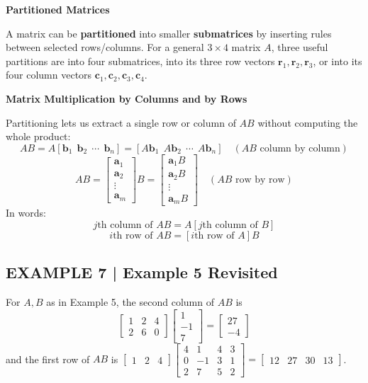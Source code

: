 \documentclass{article}
\newcommand{\redheading}[1]{{\vspace{2mm}\noindent\Large\bfseries\color{red!55!black} #1\par}\vspace{2mm}}
\theoremstyle{mystyle}
\begin{document}
\redheading{Partitioned Matrices}

A matrix can be \textbf{partitioned} into smaller \textbf{submatrices} by inserting rules between selected rows/columns. For a general $3\times4$ matrix $A$, three useful partitions are into four submatrices, into its three row vectors $\mathbf{r}_1,\mathbf{r}_2,\mathbf{r}_3$, or into its four column vectors $\mathbf{c}_1,\mathbf{c}_2,\mathbf{c}_3,\mathbf{c}_4$.

\redheading{Matrix Multiplication by Columns and by Rows}

Partitioning lets us extract a single row or column of $AB$ without computing the whole product:
\[
AB=A[\mathbf{b}_1\ \ \mathbf{b}_2\ \ \cdots\ \ \mathbf{b}_n]=[A\mathbf{b}_1\ \ A\mathbf{b}_2\ \ \cdots\ \ A\mathbf{b}_n] \tag{6}
\quad(AB\text{ column by column})
\]
\[
AB=\begin{bmatrix}\mathbf{a}_1\\\mathbf{a}_2\\\vdots\\\mathbf{a}_m\end{bmatrix}B=\begin{bmatrix}\mathbf{a}_1B\\\mathbf{a}_2B\\\vdots\\\mathbf{a}_mB\end{bmatrix} \tag{7}
\quad(AB\text{ row by row})
\]
In words:
\[
j\text{th column of }AB=A[j\text{th column of }B] \tag{8}
\]
\[
i\text{th row of }AB=[i\text{th row of }A]B \tag{9}
\]

\subsection*{EXAMPLE 7 | Example 5 Revisited}
For $A,B$ as in Example 5, the second column of $AB$ is
\[
\begin{bmatrix}1&2&4\\2&6&0\end{bmatrix}\begin{bmatrix}1\\-1\\7\end{bmatrix}=\begin{bmatrix}27\\-4\end{bmatrix}
\]
and the first row of $AB$ is $\begin{bmatrix}1&2&4\end{bmatrix}\begin{bmatrix}4&1&4&3\\0&-1&3&1\\2&7&5&2\end{bmatrix}=\begin{bmatrix}12&27&30&13\end{bmatrix}$.
\end{document}
